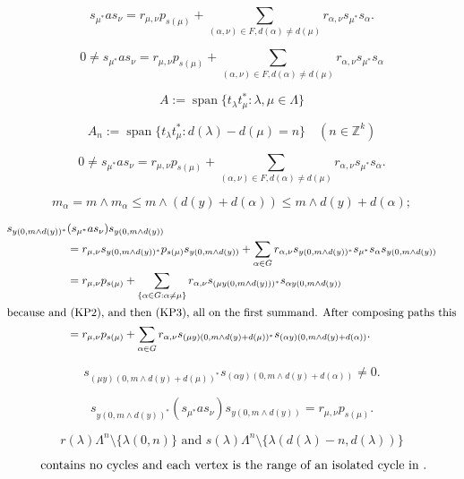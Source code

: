\documentclass[a4paper,12pt]{article}
\begin{document}
\[
s_{\mu^*}as_\nu = r_{\mu,\nu}p_{s(\mu)}+\sum_{(\alpha,\nu)\in F, d(\alpha)\neq d(\mu)} r_{\alpha,\nu}s_{\mu^*}s_\alpha.
\]

\[
0 \neq s_{\mu^*}as_\nu = r_{\mu,\nu}p_{s(\mu)}+\sum_{(\alpha,\nu)\in F, d(\alpha)\neq d(\mu)} 
r_{\alpha,\nu}s_{\mu^*}s_\alpha
\]

\[A:={\operatorname{\mathrm{span}}} \{t_{\lambda}t_{\mu}^*:\lambda, \mu \in \Lambda\}\]

\[
 A_n:= {\operatorname{\mathrm{span}}}\{t_{\lambda}t_{\mu}^*:d(\lambda)- d(\mu)=n\}\quad(n\in{\mathbb{Z}}^k)\]

\begin{equation}
\label{eq:Lem4.4}
0 \neq s_{\mu^*}as_\nu = r_{\mu,\nu}p_{s(\mu)}+\sum_{(\alpha,\nu)\in F, d(\alpha)\neq d(\mu)} 
r_{\alpha,\nu}s_{\mu^*}s_\alpha.
\end{equation}

\[m_\alpha=m \wedge m_{\alpha} \leq m \wedge (d(y) + d(\alpha)) \leq m \wedge d(y) + d(\alpha);
\]

\begin{align*}
s_{y(0,m\wedge d(y))^*}&(s_{\mu^*}as_\nu)s_{y(0,m\wedge d(y))}\\
&=r_{\mu,\nu}s_{y(0,m\wedge d(y))^*}p_{s(\mu)}s_{y(0,m\wedge d(y))} + 
\sum_{\alpha \in G}r_{\alpha,\nu}s_{y(0,m\wedge d(y))^*}s_{\mu^*}s_\alpha s_{y(0,m\wedge d(y))}\\
&=r_{\mu,\nu}p_{s(\mu)}+ \sum_{\{\alpha \in G: \alpha \neq \mu\}} 
r_{\alpha,\nu}s_{(\mu y(0,m\wedge d(y)))^*}s_{\alpha y(0,m\wedge d(y))} \\
\intertext{because  and (KP2), and then (KP3), all on the first summand. After composing paths this}
&=r_{\mu,\nu}p_{s(\mu)}+ \sum_{\alpha \in G}
 r_{\alpha,\nu}s_{(\mu y)(0,m\wedge d(y)+d(\mu))^*}s_{(\alpha y)(0,m\wedge d(y)+d(\alpha))}.
\end{align*}

\[s_{(\mu y)(0,m\wedge d(y)+d(\mu))^*}s_{(\alpha y)(0,m\wedge d(y)+d(\alpha))} \neq 0.\]

\[s_{y(0,m\wedge d(y))^*}(s_{\mu^*}as_\nu)s_{y(0,m\wedge d(y))}=r_{\mu,\nu}p_{s(\mu)}.\]

\[
 r(\lambda)\Lambda^n \setminus \{\lambda(0,n)\} \text{ and }  s(\lambda)\Lambda^n \setminus \{\lambda(d(\lambda)-n,d(\lambda))\}
\]

\begin{equation}\label{3.1}
\ \hfill
\parbox{0.9\textwidth}{
 contains no cycles and each vertex 
is the range of an isolated cycle in .
}\end{equation}
\end{document}
